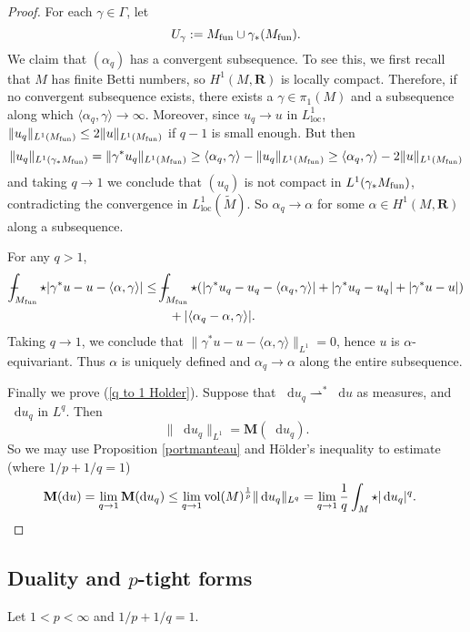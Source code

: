 \documentclass[reqno,11pt]{amsart}
\newcommand{\RR}{\mathbf{R}}
\newcommand*\dif{\mathop{}\!\mathrm{d}}
\newcommand{\weakto}{\rightharpoonup}
\newcommand{\vol}{\mathrm{vol}}
\newcommand{\Mass}{\mathbf M}
\newcommand{\loc}{\mathrm{loc}}
\theoremstyle{definition}
\numberwithin{equation}{section}
\def\Xint#1{\mathchoice
{\XXint\displaystyle\textstyle{#1}}%
{\XXint\textstyle\scriptstyle{#1}}%
{\XXint\scriptstyle\scriptscriptstyle{#1}}%
{\XXint\scriptscriptstyle\scriptscriptstyle{#1}}%
\!\int}
\def\XXint#1#2#3{{\setbox0=\hbox{$#1{#2#3}{\int}$ }
\vcenter{\hbox{$#2#3$ }}\kern-.6\wd0}}
\def\dashint{\Xint-}
\begin{document}
\begin{proof}
For each $\gamma \in \Gamma$, let
$$U_\gamma := M_{\rm fun} \cup \gamma_* (M_{\rm fun}).$$
We claim that $(\alpha_q)$ has a convergent subsequence.
To see this, we first recall that $M$ has finite Betti numbers, so $H^1(M, \RR)$ is locally compact.
Therefore, if no convergent subsequence exists, there exists a $\gamma \in \pi_1(M)$ and a subsequence along which $\langle \alpha_q, \gamma\rangle \to \infty$.
Moreover, since $u_q \to u$ in $L^1_\loc$, $\|u_q\|_{L^1(M_{\rm fun})} \leq 2\|u\|_{L^1(M_{\rm fun})}$ if $q - 1$ is small enough.
But then 
$$\|u_q\|_{L^1(\gamma_* M_{\rm fun})} = \|\gamma^* u_q\|_{L^1(M_{\rm fun})} \geq \langle \alpha_q, \gamma\rangle - \|u_q\|_{L^1(M_{\rm fun})} \geq \langle \alpha_q, \gamma\rangle - 2\|u\|_{L^1(M_{\rm fun})}$$
and taking $q \to 1$ we conclude that $(u_q)$ is not compact in $L^1(\gamma_* M_{\rm fun})$, contradicting the convergence in $L^1_\loc(\tilde M)$.
So $\alpha_q \to \alpha$ for some $\alpha \in H^1(M, \RR)$ along a subsequence.

For any $q > 1$,
\begin{align*}
\dashint_{M_{\rm fun}} \star |\gamma^* u - u - \langle \alpha, \gamma\rangle| 
&\leq \dashint_{M_{\rm fun}} \star (|\gamma^* u_q - u_q - \langle \alpha_q, \gamma\rangle| + |\gamma^* u_q - u_q| + |\gamma^* u - u|) \\
&\qquad + |\langle \alpha_q - \alpha, \gamma\rangle|.
\end{align*}
Taking $q \to 1$, we conclude that $\|\gamma^* u - u - \langle \alpha, \gamma\rangle\|_{L^1} = 0$, hence $u$ is $\alpha$-equivariant.
Thus $\alpha$ is uniquely defined and $\alpha_q \to \alpha$ along the entire subsequence.

Finally we prove (\ref{q to 1 Holder}).
Suppose that $\dif u_q \weakto^* \dif u$ as measures, and $\dif u_q$ in $L^q$.
Then
$$\|\dif u_q\|_{L^1} = \Mass(\dif u_q).$$
So we may use Proposition \ref{portmanteau} and H\"older's inequality to estimate (where $1/p + 1/q = 1$)
\begin{align*}
\Mass(\dif u) &= \lim_{q \to 1} \Mass(\dif u_q) \leq \lim_{q \to 1} \vol(M)^{\frac{1}{p}} \|\dif u_q\|_{L^q} = \lim_{q \to 1} \frac{1}{q} \int_M \star |\dif u_q|^q. \qedhere
\end{align*}
\end{proof}

\subsection{Duality and \texorpdfstring{$p$-tight forms}{p-tight forms}}
Let $1 < p < \infty$ and $1/p + 1/q = 1$.
\end{document}
